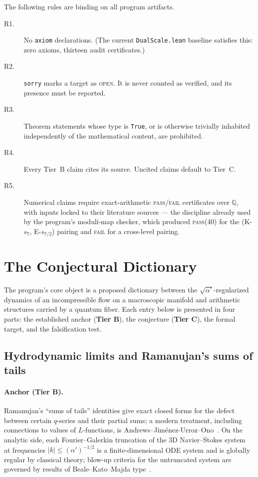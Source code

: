\documentclass[11pt,a4paper]{article}
\theoremstyle{plain}
\theoremstyle{definition}
\theoremstyle{remark}
\newcommand{\tierB}{\textbf{Tier B}}
\newcommand{\tierC}{\textbf{Tier C}}
\begin{document}
\noindent The following rules are binding on all program artifacts.

\begin{description}
\item[R1.] No \texttt{axiom} declarations. (The current
\texttt{DualScale.lean} baseline satisfies this: zero axioms, thirteen audit
certificates.)
\item[R2.] \texttt{sorry} marks a target as \textsc{open}. It is never
counted as verified, and its presence must be reported.
\item[R3.] Theorem statements whose type is \texttt{True}, or is otherwise
trivially inhabited independently of the mathematical content, are
prohibited.
\item[R4.] Every Tier~B claim cites its source. Uncited claims default to
Tier~C.
\item[R5.] Numerical claims require exact-arithmetic \textsc{pass/fail}
certificates over $\mathbb{Q}$, with inputs locked to their literature
sources --- the discipline already used by the program's moduli-map checker,
which produced \textsc{pass}(40) for the (K-$s_{7}$, E-$s_{7/2}$) pairing and
\textsc{fail} for a cross-level pairing.
\end{description}

\section{The Conjectural Dictionary}\label{sec:dictionary}

The program's core object is a proposed dictionary between the
$\sqrt{\alpha'}$-regularized dynamics of an incompressible flow on a
macroscopic manifold and arithmetic structures carried by a quantum fiber.
Each entry below is presented in four parts: the established anchor
(\tierB{}), the conjecture (\tierC{}), the formal target, and the
falsification test.

\subsection{Hydrodynamic limits and Ramanujan's sums of tails}
\label{sec:ns}

\paragraph{Anchor (\tierB{}).} Ramanujan's ``sums of tails'' identities give
exact closed forms for the defect between certain $q$-series and their
partial sums; a modern treatment, including connections to values of
$L$-functions, is Andrews--Jim\'enez-Urroz--Ono~\cite{AJO2001}. On the
analytic side, each Fourier--Galerkin truncation of the 3D Navier--Stokes
system at frequencies $|k|\le(\alpha')^{-1/2}$ is a finite-dimensional ODE
system and is globally regular by classical theory; blow-up criteria for the
untruncated system are governed by results of Beale--Kato--Majda
type~\cite{BKM1984}.
\end{document}
